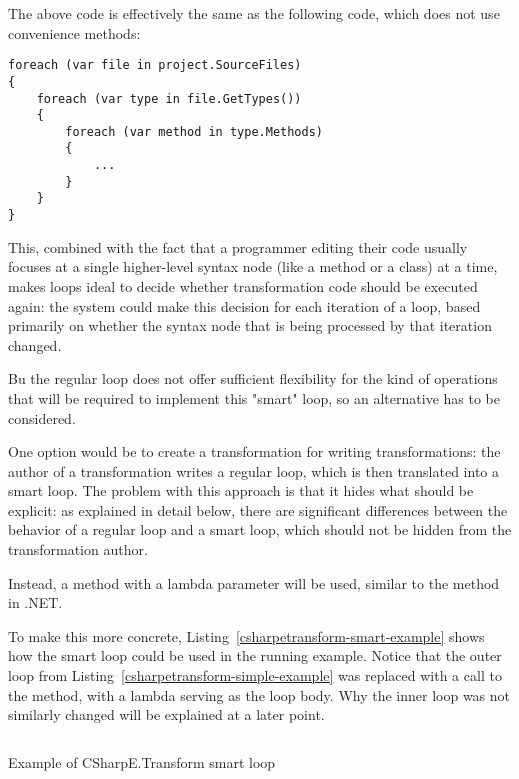 The above code is effectively the same as the following code, which does not use convenience methods:

\begin{verbatim}
foreach (var file in project.SourceFiles)
{
    foreach (var type in file.GetTypes())
    {
        foreach (var method in type.Methods)
        {
            ...
        }
    }
}
\end{verbatim}

This, combined with the fact that a programmer editing their code usually focuses at a single higher-level syntax node (like a method or a class) at a time, makes  loops ideal to decide whether transformation code should be executed again: the system could make this decision for each iteration of a  loop, based primarily on whether the syntax node that is being processed by that iteration changed.

Bu the regular  loop does not offer sufficient flexibility for the kind of operations that will be required to implement this "smart"  loop, so an alternative has to be considered.

One option would be to create a transformation for writing transformations: the author of a transformation writes a regular  loop, which is then translated into a smart loop. The problem with this approach is that it hides what should be explicit: as explained in detail below, there are significant differences between the behavior of a regular  loop and a smart loop, which should not be hidden from the transformation author.

Instead, a method with a lambda parameter will be used, similar to the  method in .NET. \cite{parallel-foreach}

\medskip

To make this more concrete, Listing~\ref{csharpetransform-smart-example} shows how the smart  loop could be used in the running example. Notice that the outer  loop from Listing~\ref{csharpetransform-simple-example} was replaced with a call to the  method, with a lambda serving as the loop body. Why the inner loop was not similarly changed will be explained at a later point.

\begin{listing}
\inputminted[firstline=9,lastline=27]{csharp}{samples/CSharpETransform.Smart/EntityTransformation.cs}
\caption{Example of CSharpE.Transform smart  loop}
\label{csharpetransform-smart-example}
\end{listing}

